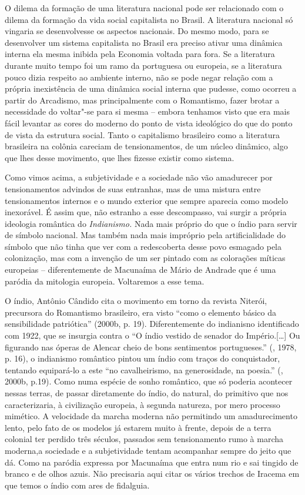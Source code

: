{O dilema da formação de uma literatura nacional pode ser relacionado com
o dilema da formação da vida social capitalista no Brasil. A literatura
nacional só vingaria se desenvolvesse os aspectos nacionais. Do mesmo
modo, para se desenvolver um sistema capitalista no Brasil era preciso
ativar uma dinâmica interna ela mesma inibida pela Economia voltada para
fora. Se a literatura durante muito tempo foi um ramo da portuguesa ou
europeia, se a literatura pouco dizia respeito ao ambiente interno, não
se pode negar relação com a própria inexistência de uma dinâmica social
interna que pudesse, como ocorreu a partir do Arcadismo, mas
principalmente com o Romantismo, fazer brotar a necessidade do voltar"-se
para si mesma -- embora tenhamos visto que era mais fácil levantar as
cores do moderno do ponto de vista ideológico do que do ponto de vista
da estrutura social. Tanto o capitalismo brasileiro como a literatura
brasileira na colônia careciam de tensionamentos, de um núcleo dinâmico,
algo que lhes desse movimento, que lhes fizesse existir como sistema.

Como vimos acima, a subjetividade e a sociedade não vão amadurecer por
tensionamentos advindos de suas entranhas, mas de uma mistura entre
tensionamentos internos e o mundo exterior que sempre aparecia como
modelo inexorável. É assim que, não estranho a esse descompasso, vai
surgir a própria ideologia romântica do \emph{Indianismo.} Nada mais
próprio do que o índio para servir de símbolo nacional. Mas também nada
mais impróprio pela artificialidade do símbolo que não tinha que ver com
a redescoberta desse povo esmagado pela colonização, mas com a invenção
de um ser pintado com as colorações míticas europeias -- diferentemente
de Macunaíma de Mário de Andrade que é uma paródia da mitologia
europeia. Voltaremos a esse tema.

O índio, Antônio Cândido cita o movimento em torno da revista Niterói,
precursora do Romantismo brasileiro, era visto ``como o elemento básico
da sensibilidade patriótica'' (2000b, p. 19). Diferentemente do
indianisno identificado com 1922, que se insurgia contra o ``O índio
vestido de senador do Império.[\ldots{}] Ou figurando nas óperas de
Alencar cheio de bons sentimentos portugueses.'' (, 1978, p. 16),
o indianismo romântico pintou um índio com traços do conquistador,
tentando equipará-lo a este ``no cavalheirismo, na generosidade, na
poesia.'' (, 2000b, p.19). Como numa espécie de sonho romântico,
que só poderia acontecer nessas terras, de passar diretamente do índio,
do natural, do primitivo que nos caracterizaria, à civilização europeia,
à segunda natureza, por mero processo mimético. A velocidade da marcha
moderna não permitindo um amadurecimento lento, pelo fato de os modelos
já estarem muito à frente, depois de a terra colonial ter perdido três
séculos, passados sem tensionamento rumo à marcha moderna,a sociedade
e a subjetividade tentam acompanhar sempre do jeito que dá. Como na paródia
expressa por Macunaíma que entra num rio e sai tingido de branco e de olhos azuis.
Não precisaria aqui citar os vários trechos de Iracema em que temos o
índio com ares de fidalguia.

}

